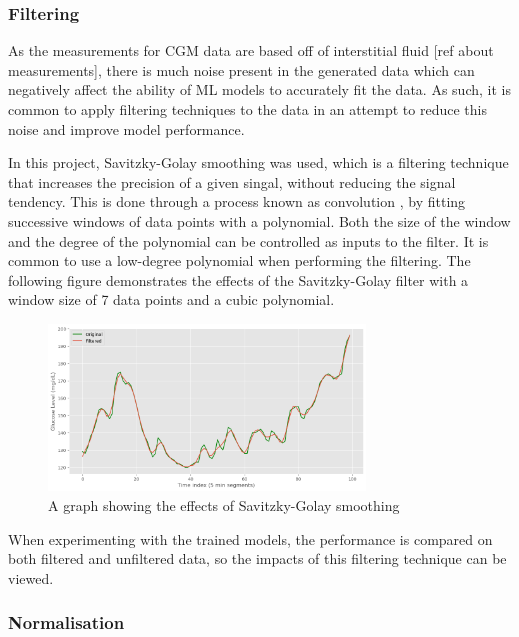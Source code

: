           \subsubsection{Filtering}

            As the measurements for CGM data are based off of interstitial fluid [ref about measurements], there is much noise present in the generated data which can negatively affect the ability of ML models to accurately fit the data. As such, it is common to apply filtering techniques to the data in an attempt to reduce this noise and improve model performance.

            In this project, Savitzky-Golay smoothing \cite{savgol} was used, which is a filtering technique that increases the precision of a given singal, without reducing the signal tendency. This is done through a process known as convolution \cite{convolution}, by fitting successive windows of data points with a polynomial. Both the size of the window and the degree of the polynomial can be controlled as inputs to the filter. It is common to use a low-degree polynomial when performing the filtering. The following figure demonstrates the effects of the Savitzky-Golay filter with a window size of 7 data points and a cubic polynomial.

            \begin{figure}[H]
              \centering
  
              \includegraphics[width=0.75\textwidth]{images/filtered.png} 
              \caption{
               A graph showing the effects of Savitzky-Golay smoothing
              }
            \end{figure}

            When experimenting with the trained models, the performance is compared on both filtered and unfiltered data, so the impacts of this filtering technique can be viewed.

          \subsubsection{Normalisation}

